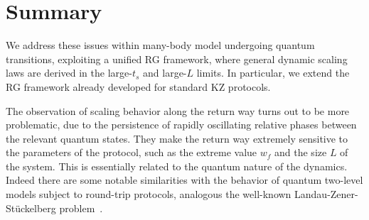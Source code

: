 \section{Summary}

We address these issues within many-body model
undergoing quantum transitions, exploiting a
unified RG framework, where general dynamic scaling
laws are derived in the large-$t_s$ and large-$L$ limits. In particular,
we extend the RG framework already developed for standard KZ protocols.


The observation of 
scaling behavior along the return way turns out to be more
problematic, due to the persistence of rapidly 
oscillating relative phases between the relevant quantum states.
They make the return way extremely sensitive to the 
parameters of the protocol, such as the extreme value $w_f$
and the size $L$ of the system. This is essentially related
to the quantum nature of the dynamics. Indeed there are
some notable similarities with the behavior of quantum
two-level models subject to round-trip protocols, 
analogous the well-known Landau-Zener-Stückelberg problem~\cite{tarantelli2022out}.\\

